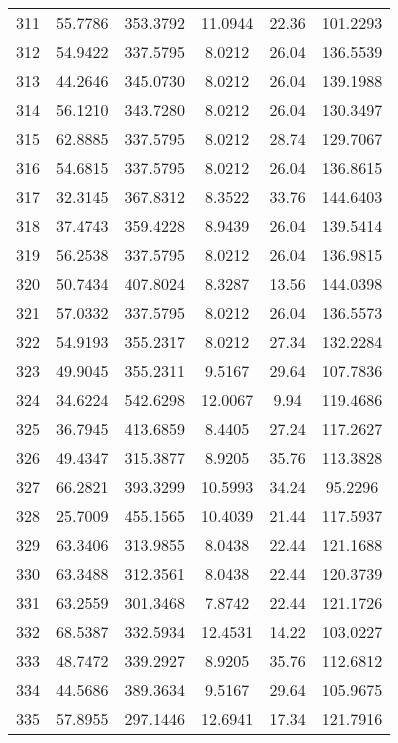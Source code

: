 \begin{center}
\begin{footnotesize}
\begin{tabular}{|c|ccccc|}
311 & 55.7786 & 353.3792 & 11.0944 & 22.36 & 101.2293 \\
312 & 54.9422 & 337.5795 & 8.0212 & 26.04 & 136.5539 \\
313 & 44.2646 & 345.0730 & 8.0212 & 26.04 & 139.1988 \\
314 & 56.1210 & 343.7280 & 8.0212 & 26.04 & 130.3497 \\
315 & 62.8885 & 337.5795 & 8.0212 & 28.74 & 129.7067 \\
316 & 54.6815 & 337.5795 & 8.0212 & 26.04 & 136.8615 \\
317 & 32.3145 & 367.8312 & 8.3522 & 33.76 & 144.6403 \\
318 & 37.4743 & 359.4228 & 8.9439 & 26.04 & 139.5414 \\
319 & 56.2538 & 337.5795 & 8.0212 & 26.04 & 136.9815 \\
320 & 50.7434 & 407.8024 & 8.3287 & 13.56 & 144.0398 \\
321 & 57.0332 & 337.5795 & 8.0212 & 26.04 & 136.5573 \\
322 & 54.9193 & 355.2317 & 8.0212 & 27.34 & 132.2284 \\
323 & 49.9045 & 355.2311 & 9.5167 & 29.64 & 107.7836 \\
324 & 34.6224 & 542.6298 & 12.0067 & 9.94 & 119.4686 \\
325 & 36.7945 & 413.6859 & 8.4405 & 27.24 & 117.2627 \\
326 & 49.4347 & 315.3877 & 8.9205 & 35.76 & 113.3828 \\
327 & 66.2821 & 393.3299 & 10.5993 & 34.24 & 95.2296 \\
328 & 25.7009 & 455.1565 & 10.4039 & 21.44 & 117.5937 \\
329 & 63.3406 & 313.9855 & 8.0438 & 22.44 & 121.1688 \\
330 & 63.3488 & 312.3561 & 8.0438 & 22.44 & 120.3739 \\
331 & 63.2559 & 301.3468 & 7.8742 & 22.44 & 121.1726 \\
332 & 68.5387 & 332.5934 & 12.4531 & 14.22 & 103.0227 \\
333 & 48.7472 & 339.2927 & 8.9205 & 35.76 & 112.6812 \\
334 & 44.5686 & 389.3634 & 9.5167 & 29.64 & 105.9675 \\
335 & 57.8955 & 297.1446 & 12.6941 & 17.34 & 121.7916 \\
\hline
\end{tabular}
\end{footnotesize}
\end{center}

